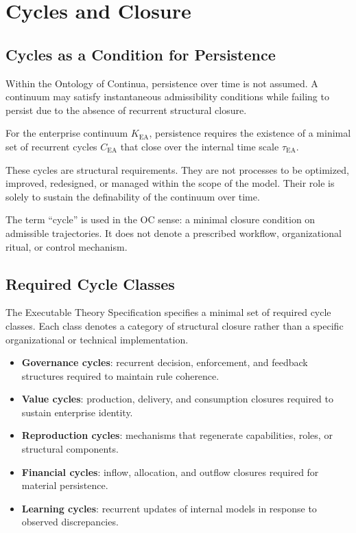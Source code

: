 
\section{Cycles and Closure}

\subsection{Cycles as a Condition for Persistence}

Within the Ontology of Continua, persistence over time is not assumed.
A continuum may satisfy instantaneous admissibility conditions while
failing to persist due to the absence of recurrent structural closure.

For the enterprise continuum $K_{\mathrm{EA}}$, persistence requires
the existence of a minimal set of recurrent cycles
$C_{\mathrm{EA}}$ that close over the internal time scale
$\tau_{\mathrm{EA}}$.

These cycles are structural requirements.
They are not processes to be optimized, improved, redesigned, or
managed within the scope of the model.
Their role is solely to sustain the definability of the continuum over
time.

The term ``cycle'' is used in the OC sense: a minimal closure condition
on admissible trajectories.
It does not denote a prescribed workflow, organizational ritual, or
control mechanism.

\subsection{Required Cycle Classes}

The Executable Theory Specification specifies a minimal set of required
cycle classes.
Each class denotes a category of structural closure rather than a
specific organizational or technical implementation.

\begin{itemize}
  \item \textbf{Governance cycles}: recurrent decision, enforcement, and
        feedback structures required to maintain rule coherence.
  \item \textbf{Value cycles}: production, delivery, and consumption
        closures required to sustain enterprise identity.
  \item \textbf{Reproduction cycles}: mechanisms that regenerate
        capabilities, roles, or structural components.
  \item \textbf{Financial cycles}: inflow, allocation, and outflow
        closures required for material persistence.
  \item \textbf{Learning cycles}: recurrent updates of internal models
        in response to observed discrepancies.
\end{itemize}

